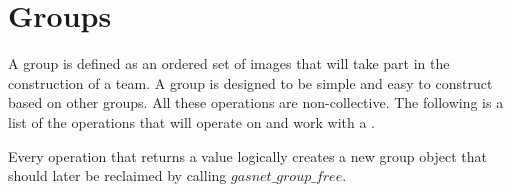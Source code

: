 \documentclass[times,10pt]{article}
\begin{document}
\newcommand{\node}[0]{gasnet\_node\_t}
\newcommand{\nodearg}[0]{gasnet\_node\_t\ n}

\newcommand{\image}[0]{gasnet\_image\_t}
\newcommand{\imagearg}[0]{gasnet\_image\_t\ i}

\section{Groups}
A \gasnet group is defined as an ordered set of \gasnet images that will take
part in the construction of a \gasnet team. A group is designed to be simple
and easy to construct based on other groups. All these operations are
non-collective. The following is a list of the operations that will operate on
and work with a \group. 

Every operation that returns a \group value logically creates a new group
object that should later be reclaimed by calling $gasnet\_group\_free$.
\end{document}
